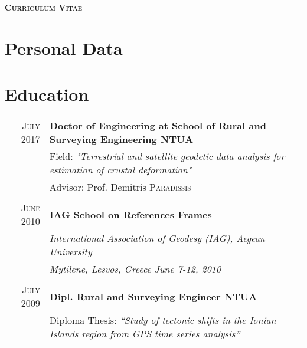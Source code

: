 \documentclass[a4paper]{Classes/cv_prof_en} %
\begin{document}
\par{\centering
                {\textbf{ \Large{ \textsc{Curriculum Vitae}}}
        }\bigskip\\}\par

\section{Personal Data}
\cvpersonalinfo

\section{Education}

\begin{tabular}{rp{14cm}}
 \textsc{July} 2017 &\textbf{Doctor of Engineering at School of Rural and Surveying Engineering NTUA}\\
& Field: \textit{"Terrestrial and satellite geodetic data analysis for estimation of crustal deformation"} \\
& \small Advisor: Prof. Demitris \textsc{Paradissis}\\&\\
 \textsc{June} 2010 & \textbf{IAG School on References Frames}\\
& \textit{International Association of Geodesy (IAG), Aegean University}\\
& \textit{Mytilene, Lesvos, Greece June 7-12, 2010}\\&\\
\textsc{July} 2009&\textbf{Dipl. Rural and Surveying Engineer NTUA}\\
& Diploma Thesis: \textit{``Study of tectonic shifts in the Ionian Islands region from GPS time series analysis''}\\
\end{tabular}

\end{document}

